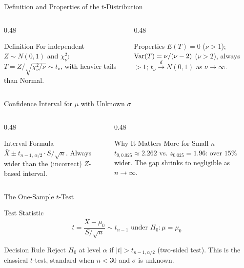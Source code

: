 \documentclass[aspectratio=169,xcolor={dvipsnames,table}]{beamer}
\begin{document}
\begin{frame}{Definition and Properties of the $t$-Distribution}
	\vspace{-0.15cm}
	\begin{columns}[T]
		\begin{column}{0.48\textwidth}
			\begin{block}{Definition}
				\footnotesize
				For independent $Z\sim N(0,1)$ and $\chi^2_\nu$: $T=Z/\sqrt{\chi^2_\nu/\nu}\sim t_\nu$, with heavier tails than Normal.
			\end{block}
		\end{column}
		\begin{column}{0.48\textwidth}
			\begin{alertblock}{Properties}
				\footnotesize
				$E(T)=0$ ($\nu>1$); $\operatorname{Var}(T)=\nu/(\nu-2)$ ($\nu>2$), always $>1$; $t_\nu \xrightarrow{d} N(0,1)$ as $\nu\to\infty$.
			\end{alertblock}
		\end{column}
	\end{columns}
\end{frame}

\begin{frame}{Confidence Interval for $\mu$ with Unknown $\sigma$}
	\vspace{-0.15cm}
	\begin{columns}[T]
		\begin{column}{0.48\textwidth}
			\begin{block}{Interval Formula}
				\footnotesize
				$\bar{X} \pm t_{n-1,\,\alpha/2}\cdot S/\sqrt{n}$. Always wider than the (incorrect) $Z$-based interval.
			\end{block}
		\end{column}
		\begin{column}{0.48\textwidth}
			\begin{alertblock}{Why It Matters More for Small $n$}
				\footnotesize
				$t_{9,0.025}\approx 2.262$ vs. $z_{0.025}=1.96$: over $15\%$ wider. The gap shrinks to negligible as $n\to\infty$.
			\end{alertblock}
		\end{column}
	\end{columns}
\end{frame}

\begin{frame}{The One-Sample $t$-Test}
	\vspace{-0.15cm}
	\begin{block}{Test Statistic}
		$$t = \dfrac{\bar{X}-\mu_0}{S/\sqrt{n}} \sim t_{n-1} \text{ under } H_0: \mu=\mu_0$$
	\end{block}
	\pause
	\vspace{0.1cm}
	\begin{alertblock}{Decision Rule}
		Reject $H_0$ at level $\alpha$ if $|t| > t_{n-1,\alpha/2}$ (two-sided test). This is the classical $t$-test, standard when $n<30$ and $\sigma$ is unknown.
	\end{alertblock}
\end{frame}
\end{document}
